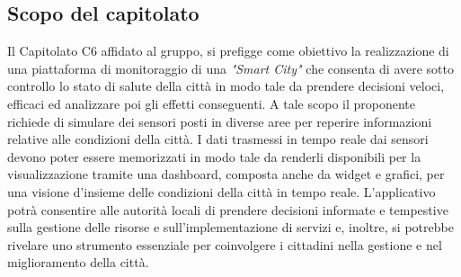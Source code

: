 \subsection{Scopo del capitolato}
    Il Capitolato C6 affidato al gruppo, si prefigge come obiettivo la realizzazione di una piattaforma di monitoraggio di una \textit{"Smart City"} che consenta di avere sotto controllo lo stato di salute della città in modo tale da prendere decisioni veloci, efficaci ed analizzare poi gli effetti conseguenti.
    A tale scopo il proponente richiede di simulare dei sensori posti in diverse aree per reperire informazioni relative alle condizioni della città. 
    I dati trasmessi in tempo reale dai sensori devono poter essere memorizzati in modo tale da renderli disponibili per la visualizzazione tramite una dashboard, composta anche da widget e grafici, per una visione d'insieme delle condizioni della città in tempo reale. 
    L'applicativo potrà consentire alle autorità locali di prendere decisioni informate e tempestive sulla gestione delle risorse e sull'implementazione di servizi e, inoltre, si potrebbe rivelare uno strumento essenziale per coinvolgere i cittadini nella gestione e nel miglioramento della città. 
